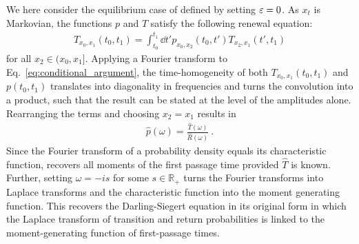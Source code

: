 \documentclass[%
 reprint,
superscriptaddress,
nofootinbib,
 amsmath,amssymb,
 aps,
prx,
]{revtex4-2}
\begin{document}
We here consider the equilibrium case of  defined by setting $\varepsilon=0$. As $x_t$ is Markovian, the functions $p$ and $T$ satisfy the following renewal equation: 
\begin{align}
\label{eq:conditional_argument}
	T_{x_0, x_1}(t_0,t_1)= 
	\int_{t_0}^{t_1} \dd{t'} p_{x_0, x_2}(t_0,t')  T_{x_2, x_1}(t',t_1)
\end{align}
for all $x_2 \in (x_0,x_1]$. 
 Applying a Fourier transform to Eq.~\eqref{eq:conditional_argument}, the time-homogeneity of both $T_{x_0, x_1}(t_0,t_1) $ and $p(t_0,t_1) $ translates into diagonality in frequencies and turns the convolution into a product, such that the result can be stated at the level of the amplitudes alone. Rearranging the terms and choosing $x_2=x_1$  results in 
\begin{align}
	\hat{p}(\omega) = \frac{\hat{T}(\omega)}{\hat{R}(\omega)}~.
	\label{eq:FPTMGFclassic}
\end{align}
Since the Fourier transform of a probability density equals its characteristic function,  recovers all moments of the first passage time provided $\hat{T}$ is known. Further, setting $\omega = -i s$ for some $s \in \mathbb{R}_+$ turns the Fourier transforms into Laplace transforms and the characteristic function into the moment generating function. This recovers the Darling-Siegert equation in its original form in which the Laplace transform of transition and return probabilities is linked to the moment-generating function of first-passage times.
\end{document}
